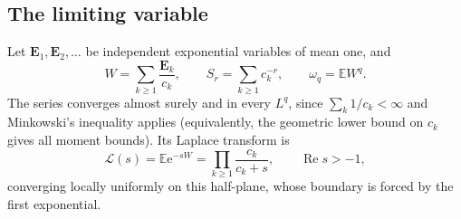 \documentclass[11pt,a4paper]{article}
\numberwithin{equation}{section}
\theoremstyle{definition}
\theoremstyle{remark}
\newcommand{\e}{\mathrm e}
\DeclareMathOperator{\Rea}{Re}
\newcommand{\E}{\mathbb E}
\newcommand{\LW}{\mathcal L}
\begin{document}
\subsection{The limiting variable}
Let $\mathbf E_1,\mathbf E_2,\ldots$ be independent exponential variables of
mean one, and
\begin{equation}\label{ctp:cl:eq:W}
 W=\sum_{k\ge1}\frac{\mathbf E_k}{c_k},\qquad S_r=\sum_{k\ge1}c_k^{-r},\qquad
 \omega_q=\E W^q.
\end{equation}
The series converges almost surely and in every $L^q$, since
$\sum_k1/c_k<\infty$ and Minkowski's inequality applies (equivalently,
the geometric lower bound on $c_k$ gives all moment bounds). Its Laplace
transform is
\begin{equation}\label{ctp:te:eq:L}
 \LW(s)=\E\e^{-sW}=\prod_{k\ge1}\frac{c_k}{c_k+s},\qquad\Rea s>-1,
\end{equation}
converging locally uniformly on this half-plane, whose boundary is forced by
the first exponential.
\end{document}
